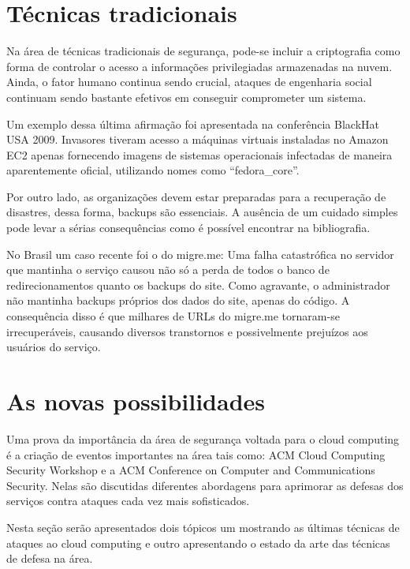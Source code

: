\documentclass[brazil,12pt]{article}
\begin{document}

\section{Técnicas tradicionais}
Na área de técnicas tradicionais de segurança, pode-se incluir a criptografia
como forma de controlar o acesso a informações privilegiadas armazenadas na nuvem. Ainda, o
fator humano continua sendo crucial, ataques de engenharia social continuam
sendo bastante efetivos em conseguir comprometer um sistema.

Um exemplo dessa última afirmação foi apresentada na conferência BlackHat USA
2009. Invasores tiveram acesso a máquinas virtuais instaladas no Amazon EC2
apenas fornecendo imagens de sistemas operacionais infectadas de maneira
aparentemente oficial, utilizando nomes como ``fedora\_core''.

Por outro lado, as organizações devem estar preparadas para a recuperação de
disastres, dessa forma, backups são essenciais. A ausência de um cuidado simples
pode levar a sérias consequências como é possível encontrar na bibliografia.

No Brasil um caso recente foi o do migre.me: Uma falha catastrófica no servidor
que mantinha o serviço causou não só a perda de todos o banco de 
redirecionamentos quanto os backups do site. Como agravante, o administrador 
não mantinha backups próprios dos dados do site, apenas do código. A
consequência disso é que milhares de URLs do migre.me tornaram-se
irrecuperáveis, causando diversos transtornos e possivelmente prejuízos aos
usuários do serviço.


\section{As novas possibilidades}
Uma prova da importância da área de segurança voltada para o cloud computing
é a criação de eventos importantes na área tais como: ACM Cloud Computing
Security Workshop e a ACM Conference on Computer and Communications Security.
Nelas são discutidas diferentes abordagens para aprimorar as defesas dos
serviços contra ataques cada vez mais sofisticados.

Nesta seção serão apresentados dois tópicos um mostrando as últimas técnicas de
ataques ao cloud computing e outro apresentando o estado da arte
das técnicas de defesa na área.
\end{document}
